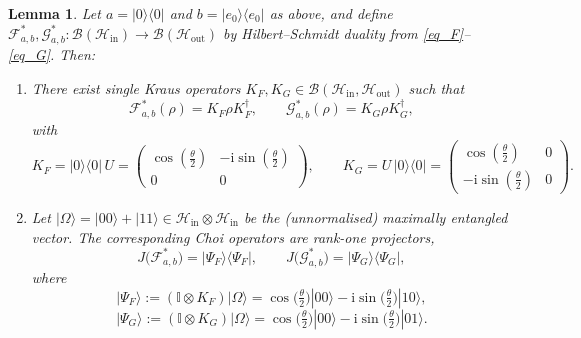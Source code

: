\documentclass[11pt, reco]{article}
\newtheorem{lemma}[theorem]{Lemma}
\begin{document}
\begin{lemma}\label{lem:F-G-Kraus}
Let \(a=|0\rangle\langle 0|\) and \(b=|e_0\rangle\langle e_0|\) as above, and define
\(\mathcal{F}_{a,b}^*,\mathcal{G}_{a,b}^*:\mathcal{B}(\mathcal{H}_{\mathrm{in}})\to\mathcal{B}(\mathcal{H}_{\mathrm{out}})\) by Hilbert–Schmidt duality
from \eqref{eq_F}–\eqref{eq_G}. Then:
\begin{enumerate}
\item There exist single Kraus operators \(K_F,K_G\in\mathcal{B}(\mathcal{H}_{\mathrm{in}},\mathcal{H}_{\mathrm{out}})\) such that
\[
\mathcal{F}_{a,b}^*(\rho)=K_F\rho K_F^{\dagger},
\qquad
\mathcal{G}_{a,b}^*(\rho)=K_G\rho K_G^{\dagger},
\]
with
\[
K_F
=
|0\rangle\langle 0|\,U
=
\begin{pmatrix}
\cos(\tfrac{\theta}{2}) & -\mathrm{i}\sin(\tfrac{\theta}{2})\\[0.25em]
0 & 0
\end{pmatrix},
\qquad
K_G
=
U\,|0\rangle\langle 0|
=
\begin{pmatrix}
\cos(\tfrac{\theta}{2}) & 0\\[0.25em]
-\mathrm{i}\sin(\tfrac{\theta}{2}) & 0
\end{pmatrix}.
\]
\item Let \(|\Omega\rangle=|00\rangle+|11\rangle\in\mathcal{H}_{\mathrm{in}}\otimes\mathcal{H}_{\mathrm{in}}\) be the (unnormalised) maximally entangled
vector. The corresponding Choi operators are rank-one projectors,
\[
J\bigl(\mathcal{F}_{a,b}^*\bigr)
=
|\Psi_F\rangle\langle\Psi_F|,
\qquad
J\bigl(\mathcal{G}_{a,b}^*\bigr)
=
|\Psi_G\rangle\langle\Psi_G|,
\]
where
\[
|\Psi_F\rangle
:=
(\mathbb{I}\otimes K_F)|\Omega\rangle
=
\cos\!\bigl(\tfrac{\theta}{2}\bigr)|00\rangle
-\mathrm{i}\sin\!\bigl(\tfrac{\theta}{2}\bigr)|10\rangle,
\]
\[
|\Psi_G\rangle
:=
(\mathbb{I}\otimes K_G)|\Omega\rangle
=
\cos\!\bigl(\tfrac{\theta}{2}\bigr)|00\rangle
-\mathrm{i}\sin\!\bigl(\tfrac{\theta}{2}\bigr)|01\rangle.
\]
\end{enumerate}
\end{lemma}
\end{document}
